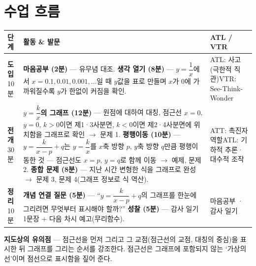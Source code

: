 \documentclass[11pt,a4paper]{article}
\begin{document}
\section{수업 흐름}
\begin{tabularx}{\linewidth}{@{}>{\centering\arraybackslash}p{1.6cm}X>{\raggedright\arraybackslash\small}p{3.1cm}@{}}
\toprule
\textbf{단계} & \textbf{활동 \& 발문} & \textbf{ATL / VTR} \\
\midrule
\textcolor{goldstrong}{\textbf{도입}}\newline\footnotesize 10분 &
\textbf{마음공부 (2분)} --- 유무념 대조.\newline
\textbf{생각 열기 (8분)} --- $y=\dfrac1x$에서 $x=0.1,0.01,0.001,\ldots$일 때 $y$값을 표로 만들며 $x$가 $0$에 가까워질수록 $y$가 한없이 커짐을 확인. &
ATL: 사고(극한적 직관)\newline VTR: See-Think-Wonder \\
\addlinespace
\textcolor{goldstrong}{\textbf{전개}}\newline\footnotesize 30분 &
\textbf{$y=\dfrac kx$의 그래프 (12분)} --- 원점에 대하여 대칭, 점근선 $x=0$, $y=0$, $k>0$이면 제1·3사분면, $k<0$이면 제2·4사분면에 위치함을 그래프로 확인 $\to$ 문제 1.\newline
\textbf{평행이동 (10분)} --- $y=\dfrac{k}{x-p}+q$는 $y=\dfrac kx$를 $x$축 방향 $p$, $y$축 방향 $q$만큼 평행이동한 것 --- 점근선도 $x=p$, $y=q$로 함께 이동 $\to$ 예제, 문제 2.\newline
\textbf{종합 문제 (8분)} --- 지난 시간 변형한 식을 그래프로 완성 $\to$ 문제 3, 문제 4(그래프 정보로 식 역산). &
ATT: 촉진자 역할\newline ATL: 기하적 추론·대수적 조작 \\
\addlinespace
\textcolor{goldstrong}{\textbf{정리}}\newline\footnotesize 10분 &
\textbf{개념 연결 질문 (5분)} --- ``$y=\dfrac{k}{x-p}+q$의 그래프를 한눈에 그리려면 무엇부터 표시해야 할까?''\newline
\textbf{성찰 (5분)} --- 감사 일기 1문장 + 다음 차시 예고(무리함수). &
마음공부 · 감사 일기 \\
\bottomrule
\end{tabularx}

\begin{calloutbox}
\textbf{지도상의 유의점} --- 점근선을 먼저 그리고 그 교점(점근선의 교점, 대칭의 중심)을 표시한 뒤 그래프를 그리는 순서를 강조한다. 점근선은 그래프에 포함되지 않는 `가상의 선'이며 점선으로 표시함을 짚어 준다.
\end{calloutbox}
\end{document}

